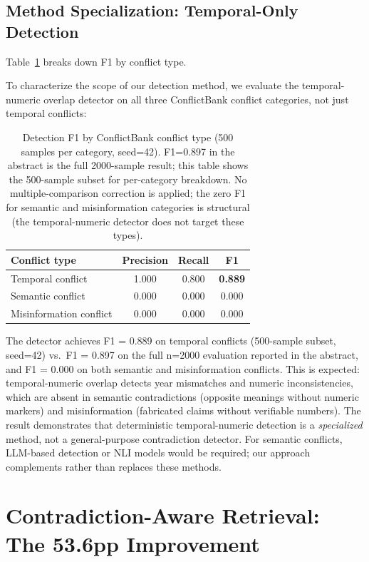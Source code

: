 \documentclass{article}
\begin{document}
\label{sec:eval}

\subsection{Method Specialization: Temporal-Only Detection}

Table~\ref{tab:specialization} breaks down F1 by conflict type.


\label{sec:specialization}

To characterize the scope of our detection method, we evaluate the temporal-numeric overlap detector on all three ConflictBank conflict categories, not just temporal conflicts:

\begin{table}[h]
\centering
\caption{Detection F1 by ConflictBank conflict type (500 samples per category, seed=42). F1=0.897 in the abstract is the full 2000-sample result; this table shows the 500-sample subset for per-category breakdown. No multiple-comparison correction is applied; the zero F1 for semantic and misinformation categories is structural (the temporal-numeric detector does not target these types).}
\begin{tabular}{lccc}
\toprule
Conflict type & Precision & Recall & F1 \\
\midrule
Temporal conflict & 1.000 & 0.800 & \textbf{0.889} \\
Semantic conflict & 0.000 & 0.000 & 0.000 \\
Misinformation conflict & 0.000 & 0.000 & 0.000 \\
\bottomrule
\end{tabular}
\label{tab:specialization}
\end{table}

The detector achieves F1 = 0.889 on temporal conflicts (500-sample subset, seed=42) vs.\ F1 = 0.897 on the full n=2000 evaluation reported in the abstract, and F1 = 0.000 on both semantic and misinformation conflicts. This is expected: temporal-numeric overlap detects year mismatches and numeric inconsistencies, which are absent in semantic contradictions (opposite meanings without numeric markers) and misinformation (fabricated claims without verifiable numbers). The result demonstrates that deterministic temporal-numeric detection is a \emph{specialized} method, not a general-purpose contradiction detector. For semantic conflicts, LLM-based detection or NLI models would be required; our approach complements rather than replaces these methods.

\section{Contradiction-Aware Retrieval: The 53.6pp Improvement}
\label{sec:retrieval}
\label{sec:caw}
\end{document}

